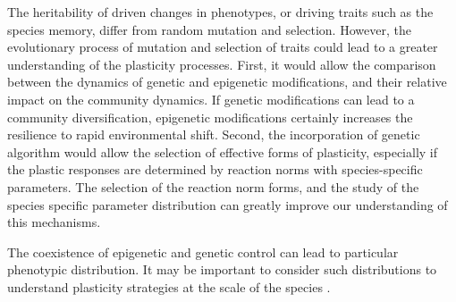 The heritability of driven changes in phenotypes, or driving traits such as the species memory, differ from random mutation and selection. However, the evolutionary process of mutation and selection of traits could lead to a greater understanding of the plasticity processes. First, it would allow the comparison between the dynamics of genetic and epigenetic modifications, and their relative impact on the community dynamics. If genetic modifications can lead to a community diversification, epigenetic modifications certainly increases the resilience to rapid environmental shift. Second, the incorporation of genetic algorithm would allow the selection of effective forms of plasticity, especially if the plastic responses are determined by reaction norms with species-specific parameters. The selection of the reaction norm forms, and the study of the species specific parameter distribution can greatly improve our understanding of this mechanisms.

The coexistence of epigenetic and genetic control can lead to particular phenotypic distribution. It may be important to consider such distributions to understand plasticity strategies at the scale of the species \parencite{dewitt_expanding_2016}.


